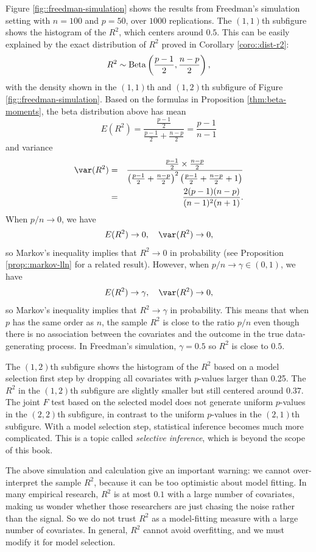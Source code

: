 Figure \ref{fig::freedman-simulation} shows the results from Freedman's simulation setting with $n=100$ and $p=50$, over $1000$ replications. 
The $(1,1)$th subfigure shows the histogram of the $R^2$, which centers around $0.5$. 
This can be easily explained by the exact distribution of $R^{2}$ proved in Corollary \ref{coro::dist-r2}: 
\[
R^{2}\sim\textup{Beta}\left(\frac{p-1}{2},\frac{n-p}{2}\right),
\]
with the density shown in the $(1,1)$th and $(1,2)$th subfigure of Figure \ref{fig::freedman-simulation}. Based on the formulas in Proposition \ref{thm:beta-moments}, the beta distribution above has mean
\[
E(R^{2})=\frac{\frac{p-1}{2}}{\frac{p-1}{2}+\frac{n-p}{2}}=\frac{p-1}{n-1}
\]
 and variance
\begin{eqnarray*}
\var(R^{2}) 
&=& \frac{\frac{p-1}{2}\times\frac{n-p}{2}}{\left(\frac{p-1}{2}+\frac{n-p}{2}\right)^{2}\left(\frac{p-1}{2}+\frac{n-p}{2}+1\right)} \\
&=&\frac{2(p-1)(n-p)}{(n-1)^{2}(n+1)}.
\end{eqnarray*}
When $p/n\rightarrow0$, we have 
\[
E(R^{2})\rightarrow0,\quad\var(R^{2})\rightarrow0,
\]
so Markov's inequality implies that $R^{2}\rightarrow0$ in probability (see Proposition \ref{prop::markov-lln} for a related result).
However, when $p/n\rightarrow\gamma\in(0,1)$, we have 
\[
E(R^{2})\rightarrow\gamma,\quad\var(R^{2})\rightarrow0,
\]
so Markov's inequality implies that $R^{2}\rightarrow\gamma$ in probability.
This means that when $p$ has the same order as $n$, the sample
$R^{2}$ is close to the ratio $p/n$ even though there is no association
between the covariates and the outcome in the true data-generating
process. In Freedman's simulation, $\gamma=0.5$ so $R^{2}$ is close
to $0.5$. 


The $(1,2)$th subfigure shows the histogram of the $R^2$ based on a model selection first step by dropping all covariates with $p$-values larger than 0.25. The $R^2$ in the $(1,2)$th subfigure are slightly smaller but still centered around $0.37$. The joint $F$ test based on the selected model does not generate uniform $p$-values in the $(2,2)$th subfigure, in contrast to the uniform $p$-values in the $(2,1)$th subfigure. With a model selection step, statistical inference becomes much more complicated. This is a topic called {\it selective inference}, which is beyond the scope of this book. 




The above simulation and calculation give an important warning: we cannot
over-interpret the sample $R^{2}$, because it can be too optimistic
about model fitting. In many empirical research, $R^{2}$ is at most
$0.1$ with a large number of covariates, making us wonder whether those researchers are just chasing the noise rather than the signal. So we do not trust $R^{2}$ as a model-fitting measure with a
large number of covariates. In general, $R^2$ cannot avoid overfitting, and we must modify it for model selection. 





